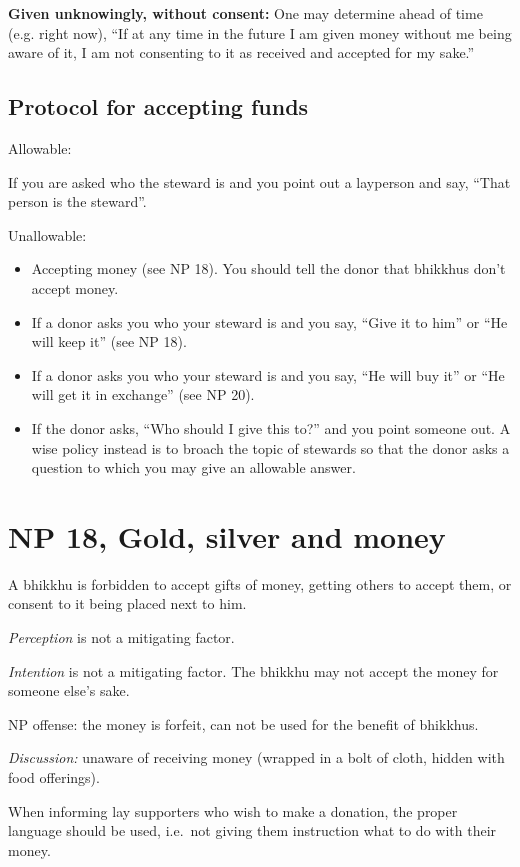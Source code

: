 \textbf{Given unknowingly, without consent:} One may determine ahead of
time (e.g. right now), ``If at any time in the future I am given money
without me being aware of it, I am not consenting to it as received and
accepted for my sake.''

\subsection{Protocol for accepting funds}

Allowable:

If you are asked who the steward is and you point out a layperson and
say, ``That person is the steward''.

Unallowable:

\begin{itemize}
\tightlist
\item
  Accepting money (see NP 18). You should tell the donor that bhikkhus
  don't accept money.
\item
  If a donor asks you who your steward is and you say, ``Give it to
  him'' or ``He will keep it'' (see NP 18).
\item
  If a donor asks you who your steward is and you say, ``He will buy
  it'' or ``He will get it in exchange'' (see NP 20).
\item
  If the donor asks, ``Who should I give this to?'' and you point
  someone out. A wise policy instead is to broach the topic of stewards
  so that the donor asks a question to which you may give an allowable
  answer.
\end{itemize}

\section{NP 18, Gold, silver and money}

A bhikkhu is forbidden to accept gifts of money, getting others to
accept them, or consent to it being placed next to him.

\emph{Perception} is not a mitigating factor.

\emph{Intention} is not a mitigating factor. The bhikkhu may not accept
the money for someone else's sake.

NP offense: the money is forfeit, can not be used for the benefit of
bhikkhus.

\emph{Discussion:} unaware of receiving money (wrapped in a bolt of
cloth, hidden with food offerings).

When informing lay supporters who wish to make a donation, the proper
language should be used, i.e.~not giving them instruction what to do
with their money.

